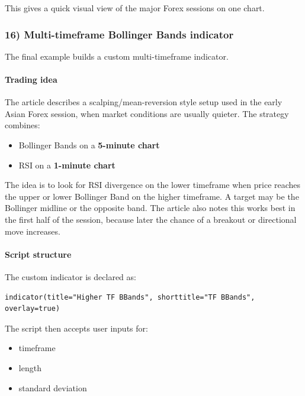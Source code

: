 \documentclass[12pt,openany]{book}
\begin{document}
This gives a quick visual view of the major Forex sessions on one chart.

\subsubsection{16) Multi-timeframe Bollinger Bands indicator}

The final example builds a custom multi-timeframe indicator.

\paragraph{Trading idea}

The article describes a scalping/mean-reversion style setup used in the early Asian Forex session, when market conditions are usually quieter. The strategy combines:

\begin{itemize}[leftmargin=*]
    \item Bollinger Bands on a \textbf{5-minute chart}
    \item RSI on a \textbf{1-minute chart}
\end{itemize}

The idea is to look for RSI divergence on the lower timeframe when price reaches the upper or lower Bollinger Band on the higher timeframe. A target may be the Bollinger midline or the opposite band. The article also notes this works best in the first half of the session, because later the chance of a breakout or directional move increases.

\paragraph{Script structure}

The custom indicator is declared as:

\begin{Verbatim}[breaklines=true,breakanywhere=true,fontsize=\small]
indicator(title="Higher TF BBands", shorttitle="TF BBands", overlay=true)
\end{Verbatim}

The script then accepts user inputs for:

\begin{itemize}[leftmargin=*]
    \item timeframe
    \item length
    \item standard deviation
\end{itemize}
\end{document}
